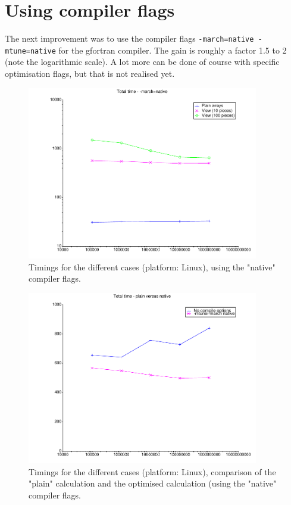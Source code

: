 \documentclass[onecolumn]{article}
\begin{document}
\section{Using compiler flags}
The next improvement was to use the compiler flags \verb+-march=native -mtune=native+ for the gfortran compiler.
The gain is roughly a factor 1.5 to 2 (note the logarithmic scale). A lot more can be done of course with specific
optimisation flags, but that is not realised yet.

\begin{figure}
\includegraphics[width=0.9\textwidth]{total_native.pdf}
\caption{Timings for the different cases (platform: Linux), using the "native" compiler flags.}
\end{figure}

\begin{figure}
\includegraphics[width=0.9\textwidth]{total_plain_native.pdf}
\caption{Timings for the different cases (platform: Linux), comparison of the "plain" calculation and the
optimised calculation (using the "native" compiler flags.}
\end{figure}
\end{document}
